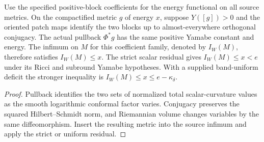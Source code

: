 \begin{proposition}
\label{thm:one-cut-same-type-descent}
\leanok
Use the specified positive-block coefficients for the energy functional
on all source metrics. On the compactified metric $g$ of energy $x$,
suppose $Y([g])>0$ and the oriented patch maps identify the two blocks
up to almost-everywhere orthogonal conjugacy. The actual pullback
$\Phi^*g$ has the same positive Yamabe constant and energy. The infimum
on $M$ for this coefficient family, denoted by $I_W(M)$, therefore
satisfies $I_W(M)\le x$. The strict scalar residual gives $I_W(M)\le x<e$ under its Ricci and
subround Yamabe hypotheses. With a supplied band-uniform deficit the
stronger inequality is $I_W(M)\le x\le e-\kappa_\delta$.
\end{proposition}
\begin{proof}
\leanok
Pullback identifies the two sets of normalized total scalar-curvature
values as the smooth logarithmic conformal factor varies. Conjugacy
preserves the squared Hilbert--Schmidt norm, and Riemannian volume
changes variables by the same diffeomorphism. Insert the resulting
metric into the source infimum and apply the strict or uniform residual.
\end{proof}


